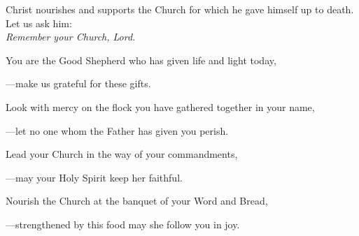 \intercessions\indent

\begin{hangpar}

Christ nourishes and supports the Church for which he gave himself up to death. Let us ask him:\\
\emph{Remember your Church, Lord.}

\medskip You are the Good Shepherd who has given life and light today,

{\color{red}---\thinspace}make us grateful for these gifts.

\medskip Look with mercy on the flock you have gathered together in your name,

{\color{red}---\thinspace}let no one whom the Father has given you perish.

\medskip Lead your Church in the way of your commandments,

{\color{red}---\thinspace}may your Holy Spirit keep her faithful.

\medskip Nourish the Church at the banquet of your Word and Bread,

{\color{red}---\thinspace}strengthened by this food may she follow you in joy.

\end{hangpar}

